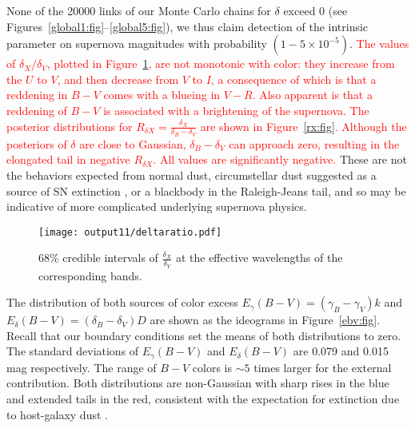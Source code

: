 \documentclass{aastex61}   	%
\begin{document}
%

None of the 20000 links of 
our Monte Carlo chains for $\delta$ exceed 0 (see Figures~\ref{global1:fig}--\ref{global5:fig}), we thus claim detection of the
intrinsic parameter on supernova magnitudes
with probability $(1-5\times 10^{-5})$.
\textcolor{red}{
The values of $\delta_X/\delta_V$, plotted in  Figure~\ref{deltaratio:fig}, are not monotonic with color: they increase from the $U$ to $V$, and then decrease
from $V$ to $I$,
a consequence
of which is that
a reddening in $B-V$ comes with a blueing in $V-R$.
Also apparent is that a reddening of $B-V$ is associated with a brightening of the supernova.
The posterior distributions for $R_{\delta X}=\frac{\delta_X}{\delta_B-\delta_V}$ are shown in Figure~\ref{rx:fig}.
Although the posteriors of $\delta$ are close to Gaussian, $\delta_B-\delta_V$ can approach zero, resulting in the
elongated tail in negative  $R_{\delta X}$.
All values are significantly negative.}
These are not the behaviors expected from normal dust,
circumstellar dust suggested as a source of SN extinction \citep{2005ApJ...635L..33W,2008ApJ...686L.103G,
2015ApJ...807L..26G}, or a blackbody in the Raleigh-Jeans tail, and so may be indicative of
more complicated underlying supernova physics.

\begin{figure}[htbp] %
   \centering
   \texttt{[image: output11/deltaratio.pdf]}
   \caption{68\% credible intervals of $\frac{\delta_X}{\delta_V}$ at the effective wavelengths of the corresponding bands.
   \label{deltaratio:fig}}
\end{figure}

The distribution of both sources of color excess $E_\gamma(B-V) =(\gamma_B-\gamma_V)k$ and
 $E_\delta(B-V) = (\delta_B-\delta_V)D$ are shown as the ideograms in Figure~\ref{ebv:fig}.
Recall that our boundary conditions set the means of both distributions to zero. 
The standard deviations of $E_\gamma(B-V)$ and $E_\delta(B-V)$ are
0.079
and 0.015
mag respectively.
The range of $B-V$ colors is $\sim 5$ times larger for the external contribution. 
Both distributions are non-Gaussian with sharp rises in the blue and extended tails in the red, consistent
with the expectation for extinction due to host-galaxy dust \citep{1998ApJ...502..177H}.
\end{document}

